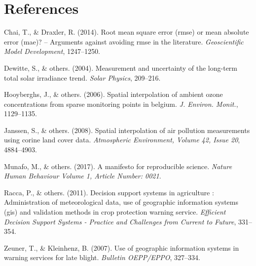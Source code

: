\documentclass[12pt,twoside]{reedthesis}
\theoremstyle{definition}
\theoremstyle{definition}
\theoremstyle{definition}
\theoremstyle{remark}
\begin{document}
\chapter*{References}\label{references}


\noindent

\setlength{\parindent}{-0.20in} \setlength{\leftskip}{0.20in}
\setlength{\parskip}{8pt}

\hypertarget{refs}{}
\hypertarget{ref-chai2014}{}
Chai, T., \& Draxler, R. (2014). Root mean square error (rmse) or mean
absolute error (mae)? -- Arguments against avoiding rmse in the
literature. \emph{Geoscientific Model Development}, 1247--1250.

\hypertarget{ref-dewitte2004}{}
Dewitte, S., \& others. (2004). Measurement and uncertainty of the
long-term total solar irradiance trend. \emph{Solar Physics}, 209--216.

\hypertarget{ref-hooyberghs2006}{}
Hooyberghs, J., \& others. (2006). Spatial interpolation of ambient
ozone concentrations from sparse monitoring points in belgium. \emph{J.
Environ. Monit.}, 1129--1135.

\hypertarget{ref-janssen2008}{}
Janssen, S., \& others. (2008). Spatial interpolation of air pollution
measurements using corine land cover data. \emph{Atmospheric
Environment, Volume 42, Issue 20}, 4884--4903.

\hypertarget{ref-munafo2017}{}
Munafo, M., \& others. (2017). A manifesto for reproducible science.
\emph{Nature Human Behaviour Volume 1, Article Number: 0021}.

\hypertarget{ref-racca2011}{}
Racca, P., \& others. (2011). Decision support systems in agriculture :
Administration of meteorological data, use of geographic information
systems (gis) and validation methods in crop protection warning service.
\emph{Efficient Decision Support Systems - Practice and Challenges from
Current to Future}, 331--354.

\hypertarget{ref-zeuner2007}{}
Zeuner, T., \& Kleinhenz, B. (2007). Use of geographic information
systems in warning services for late blight. \emph{Bulletin OEPP/EPPO},
327--334.

\end{document}
